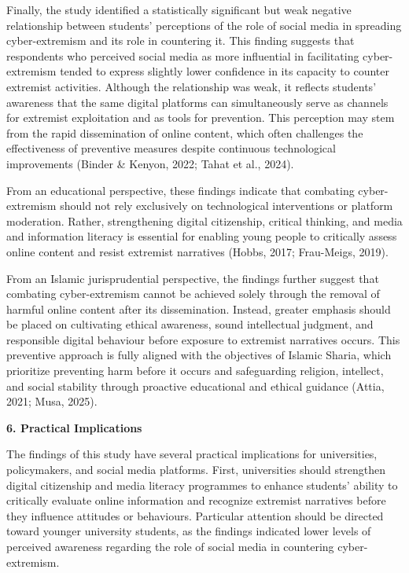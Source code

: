 \documentclass[11pt,a4paper]{article}
\begin{document}
	Finally, the study identified a statistically significant but weak negative relationship between students' perceptions of the role of social media in spreading cyber-extremism and its role in countering it. This finding suggests that respondents who perceived social media as more influential in facilitating cyber-extremism tended to express slightly lower confidence in its capacity to counter extremist activities. Although the relationship was weak, it reflects students' awareness that the same digital platforms can simultaneously serve as channels for extremist exploitation and as tools for prevention. This perception may stem from the rapid dissemination of online content, which often challenges the effectiveness of preventive measures despite continuous technological improvements (Binder \& Kenyon, 2022; Tahat et al., 2024).
	
	From an educational perspective, these findings indicate that combating cyber-extremism should not rely exclusively on technological interventions or platform moderation. Rather, strengthening digital citizenship, critical thinking, and media and information literacy is essential for enabling young people to critically assess online content and resist extremist narratives (Hobbs, 2017; Frau-Meigs, 2019).
	
	From an Islamic jurisprudential perspective, the findings further suggest that combating cyber-extremism cannot be achieved solely through the removal of harmful online content after its dissemination. Instead, greater emphasis should be placed on cultivating ethical awareness, sound intellectual judgment, and responsible digital behaviour before exposure to extremist narratives occurs. This preventive approach is fully aligned with the objectives of Islamic Sharia, which prioritize preventing harm before it occurs and safeguarding religion, intellect, and social stability through proactive educational and ethical guidance (Attia, 2021; Musa, 2025).
	
	\textbf{6. Practical Implications}
	
	The findings of this study have several practical implications for universities, policymakers, and social media platforms. First, universities should strengthen digital citizenship and media literacy programmes to enhance students' ability to critically evaluate online information and recognize extremist narratives before they influence attitudes or behaviours. Particular attention should be directed toward younger university students, as the findings indicated lower levels of perceived awareness regarding the role of social media in countering cyber-extremism.
	
\end{document}
